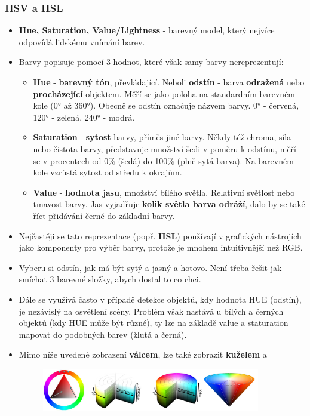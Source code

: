 \subsubsection{HSV a HSL}
\begin{itemize}
	\item \textbf{Hue, Saturation, Value/Lightness} - barevný model, který nejvíce odpovídá lidskému vnímání barev.
	\item Barvy popisuje pomocí 3 hodnot, které však samy barvy nereprezentují:
	\begin{itemize}
		\item \textbf{Hue} - \textbf{barevný tón}, převládající. Neboli \textbf{odstín} - barva \textbf{odražená} nebo \textbf{procházející} objektem. Měří se jako poloha na standardním barevném kole (\ang{0} až \ang{360}). Obecně se odstín označuje názvem barvy. \ang{0} - červená, \ang{120} - zelená, \ang{240} - modrá.
		\item \textbf{Saturation} - \textbf{sytost} barvy, příměs jiné barvy. Někdy též chroma, síla nebo čistota barvy, představuje množství šedi v poměru k odstínu, měří se v procentech od 0\% (šedá) do 100\% (plně sytá barva). Na barevném kole vzrůstá sytost od středu k okrajům.
		\item \textbf{Value} - \textbf{hodnota jasu}, množství bílého světla. Relativní světlost nebo tmavost barvy. Jas vyjadřuje \textbf{kolik světla barva odráží}, dalo by se také říct přidávání černé do základní barvy.
	\end{itemize}
	\item Nejčastěji se tato reprezentace (popř. \textbf{HSL}) používají v grafických nástrojích jako komponenty pro výběr barvy, protože je mnohem intuitivnější než RGB. 
	\item Vyberu si odstín, jak má být sytý a jasný a hotovo. Není třeba řešit jak smíchat 3 barevné složky, abych dostal to co chci.
	\item Dále se využívá často v případě detekce objektů, kdy hodnota HUE (odstín), je nezávislý na osvětlení scény. Problém však nastává u bílých a černých objektů (kdy HUE může být různé), ty lze na základě value a staturation mapovat do podobných barev (žlutá a černá).
	\item Mimo níže uvedené zobrazení \textbf{válcem}, lze také zobrazit \textbf{kuželem} a 
	\begin{figure}[H]
	\centering
	\includegraphics[width=0.9\textwidth]{assets/1_hsv_hsl}
	\end{figure}
\end{itemize}

